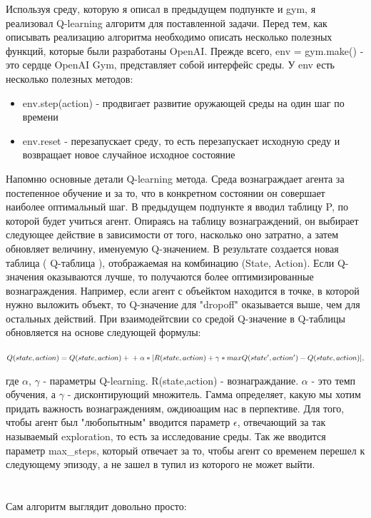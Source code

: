 \documentclass[12pt, a4paper]{report}
\theoremstyle{definition}
\theoremstyle{plain}
\theoremstyle{remark}
\theoremstyle{remark}
\theoremstyle{definition}
\begin{document}
Используя среду, которую я описал в предыдущем подпункте и gym, я реализовал Q-learning алгоритм для поставленной задачи. Перед тем, как описывать реализацию алгоритма необходимо описать несколько полезных функций, которые были разработаны OpenAI. Прежде всего, env = gym.make() - это сердце OpenAI Gym, представляет собой интерфейс среды. У env есть несколько полезных методов:
\begin{itemize}
    \item env.step(action) - продвигает развитие оружающей среды на один шаг по времени
    \item env.reset - перезапускает среду, то есть перезапускает исходную среду и возвращает новое случайное исходное состояние
\end{itemize}
Напомню основные детали Q-learning метода. Среда вознаграждает агента за постепенное обучение и за то, что в конкретном состоянии он совершает наиболее оптимальный шаг. В предыдущем подпункте я вводил таблицу P, по которой будет учиться агент. Опираясь на таблицу вознаграждений, он выбирает следующее действие в зависимости от того, насколько оно затратно, а затем обновляет величину, именуемую Q-значением. В результате создается новая таблица ( Q-таблица ), отображаемая на комбинацию (State, Action). Если Q-значения оказываются лучше, то получаются более оптимизированные вознаграждения. Например, если агент с объейктом находится в точке, в которой нужно выложить объект, то Q-значение для "dropoff" оказывается выше, чем для остальных действий. При взаимодейтсвии со средой Q-значение в Q-таблицы обновляется на основе следующей формулы:
\begin{center}
    $
    Q(state, action) = Q(state,action) + \\
    + \alpha*[R(state, action) + \gamma*maxQ(state', action') - Q(state,action)],
    $
\end{center}
где $\alpha$, $\gamma$ - параметры Q-learning. R(state,action) - вознаграждание. $\alpha$ - это темп обучения, а $\gamma$ - дисконтирующий множитель. Гамма определяет, какую мы хотим придать важность вознаграждениям, ождиюащим нас в перпективе. Для того, чтобы агент был "любопытным" вводится параметр $\epsilon$, отвечающий за так называемый exploration, то есть за исследование среды. Так же вводится параметр max\_steps, который отвечает за то, чтобы агент со временем перешел к следующему эпизоду, а не зашел в тупил из которого не может выйти.\\
\\
\\
Сам алгоритм выглядит довольно просто:
\end{document}

